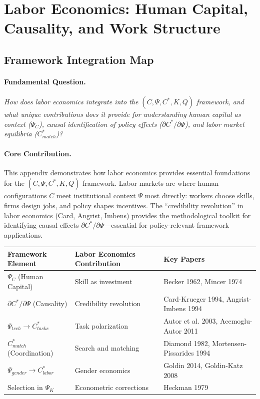 \section{Labor Economics: Human Capital, Causality, and Work Structure}
\label{app:labor-economics}

\subsection{Framework Integration Map}

\paragraph{Fundamental Question.}
\textit{How does labor economics integrate into the $(C, \Psi, C^*, K, Q)$ framework, and what unique contributions does it provide for understanding human capital as context ($\Psi_C$), causal identification of policy effects ($\partial C^*/\partial \Psi$), and labor market equilibria ($C^*_{match}$)?}

\paragraph{Core Contribution.}
This appendix demonstrates how labor economics provides essential foundations 
for the $(C, \Psi, C^*, K, Q)$ framework. Labor markets are where human 
configurations $C$ meet institutional context $\Psi$ most directly: workers 
choose skills, firms design jobs, and policy shapes incentives. The ``credibility 
revolution'' in labor economics (Card, Angrist, Imbens) provides the methodological 
toolkit for identifying causal effects $\partial C^* / \partial \Psi$---essential 
for policy-relevant framework applications.

\begin{center}
\renewcommand{\arraystretch}{1.4}
\begin{tabular}{|l|l|l|}
\hline
\textbf{Framework Element} & \textbf{Labor Economics Contribution} & \textbf{Key Papers} \\
\hline
$\Psi_C$ (Human Capital) & Skill as investment & Becker 1962, Mincer 1974 \\
$\partial C^* / \partial \Psi$ (Causality) & Credibility revolution & Card-Krueger 1994, Angrist-Imbens 1994 \\
$\Psi_{tech} \to C^*_{tasks}$ & Task polarization & Autor et al. 2003, Acemoglu-Autor 2011 \\
$C^*_{match}$ (Coordination) & Search and matching & Diamond 1982, Mortensen-Pissarides 1994 \\
$\Psi_{gender} \to C^*_{labor}$ & Gender economics & Goldin 2014, Goldin-Katz 2008 \\
Selection in $\Psi_K$ & Econometric corrections & Heckman 1979 \\
\hline
\end{tabular}
\end{center}

